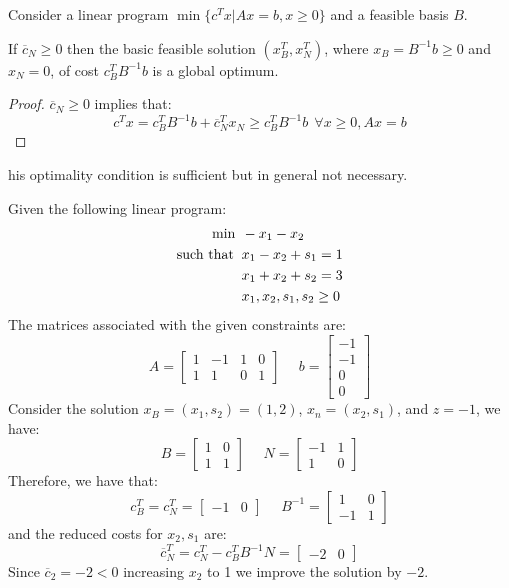 \documentclass[12pt, a4paper]{report}
\begin{document}
    Consider a linear program $\min\{c^Tx|Ax=b,x\geq 0\}$ and a feasible basis $B$. 
    \begin{proposition}
        If $\overline{c}_N \geq 0$ then the basic feasible solution $(x_B^T,x_N^T)$, where $x_B=B^{-1}b \geq 0$ and $x_N = 0$, of cost $c_B^TB^{-1}b$ is a global optimum. 
    \end{proposition}
    \begin{proof}
        $\overline{c}_N \geq 0$ implies that: 
        \[c^Tx=c_B^TB^{-1}b+\overline{c}_N^Tx_N \geq c_B^TB^{-1}b \:\: \forall x \geq 0, Ax=b\]
    \end{proof}
    his optimality condition is sufficient but in general not necessary. 
    \begin{example}
        Given the following linear program: 
        \begin{align*}
            \min                      \:&\: -x_1-x_2          \\
            \textnormal{such that }     &\: x_1-x_2+s_1=1  \\
                                        &\: x_1+x_2+s_2=3  \\
                                        &\: x_1,x_2,s_1,s_2 \geq 0
        \end{align*}
        The matrices associated with the given constraints are: 
        \[
        A=
        \begin{bmatrix}
            1 & -1 & 1 & 0  \\
            1 & 1 & 0 & 1 
        \end{bmatrix}
        \:\:\:\:\:\:
        b=
        \begin{bmatrix}
            -1 \\
            -1 \\
            0  \\
            0
        \end{bmatrix}
        \]
        Consider the solution $x_B=(x_1,s_2)=(1,2)$, $x_n=(x_2,s_1)$, and $z=-1$, we have: 
        \[
        B=
        \begin{bmatrix}
            1 & 0  \\
            1 & 1  
        \end{bmatrix}
        \:\:\:\:\:\:
        N=
        \begin{bmatrix}
            -1 & 1  \\
            1  & 0  
        \end{bmatrix}
        \]
        Therefore, we have that:
        \[c_B^T=c_N^T=\begin{bmatrix} -1 & 0 \end{bmatrix} \:\:\:\:\:\: B^{-1}=
        \begin{bmatrix}
            1  & 0  \\
            -1 & 1  
        \end{bmatrix}
        \]
        and the reduced costs for $x_2,s_1$ are: 
        \[\overline{c}_N^T=c_N^T-c_B^TB^{-1}N=\begin{bmatrix} -2 & 0 \end{bmatrix}\]
        Since $\overline{c}_2=-2<0$ increasing $x_2$ to 1 we improve the solution by $-2$. 
    \end{example}
\end{document}
